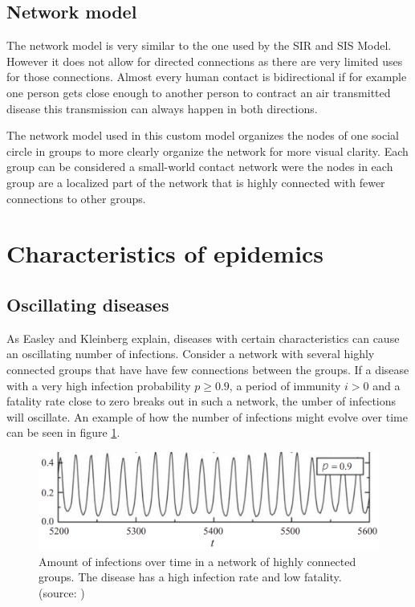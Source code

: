 \subsection{Network model}
The network model is very similar to the one used by the SIR and SIS Model. However it does
not allow for directed connections as there are very limited uses for those connections. 
Almost every human contact is bidirectional if for example one person gets close enough to
another person to contract an air transmitted disease this transmission can always happen
in both directions.

The network model used in this custom model organizes the nodes of one social circle in groups
to more clearly organize the network for more visual clarity. Each group can be 
considered a small-world contact network were the nodes in each group are a localized part
of the network that is highly connected with fewer connections to other groups.

\section{Characteristics of epidemics}
\subsection{Oscillating diseases}
As Easley and Kleinberg \cite{networks} explain, diseases with certain characteristics
can cause an oscillating number of infections. Consider a network with several highly
connected groups that have have few connections between the groups. If a disease
with a very high infection probability $p\geq0.9$, a period of immunity $i > 0$ and a
fatality rate close to zero breaks out in such a network, the umber of infections will oscillate.
An example of how the number of infections might evolve over time can be seen in figure 
\ref{fig:oscillation}.
\begin{figure}
    \centering
    \includegraphics[width=0.5\linewidth]{images/oscillation.png}
    \caption{Amount of infections over time in a network of highly connected 
    groups. The disease has a high infection rate and low fatality. (source: \cite{networks})}
    \label{fig:oscillation}
\end{figure}


